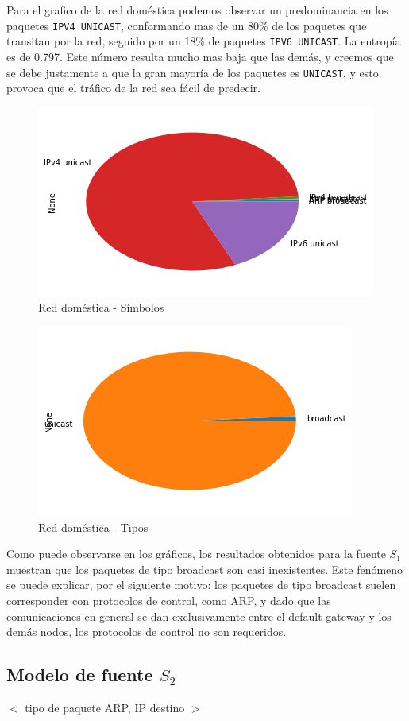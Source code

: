 Para el grafico de la red doméstica podemos observar un predominancia en los paquetes \texttt{IPV4 UNICAST}, conformando mas de un 80\% de los paquetes que transitan por la red, seguido por un 18\% de paquetes \texttt{IPV6 UNICAST}. La entropía es de 0.797. Este número resulta mucho mas baja que las demás, y creemos que se debe justamente a que la gran mayoría de los paquetes es \texttt{UNICAST}, y esto provoca que el tráfico de la red sea fácil de predecir.

\begin{figure}[H]
	\centering
	\includegraphics[width=.5\linewidth]{imagenes/manu_casa_torta_simbolos}
	\caption{Red doméstica - Símbolos}
\end{figure}

\begin{figure}[H]
	\centering
	\includegraphics[width=.5\linewidth]{imagenes/manu_casa_torta_tipos}
	\caption{Red doméstica - Tipos}
\end{figure}

Como puede observarse en los gráficos, los resultados obtenidos para la fuente $S_1$ muestran que los paquetes de tipo broadcast son casi inexistentes. Este fenómeno se puede explicar, por el siguiente motivo: los paquetes de tipo broadcast suelen corresponder con protocolos de control, como ARP, y dado que las comunicaciones en general se dan exclusivamente entre el default gateway y los demás nodos, los protocolos de control no son requeridos.


\subsection{Modelo de fuente $S_2$}


$<$ tipo de paquete ARP, IP destino $>$ \\



